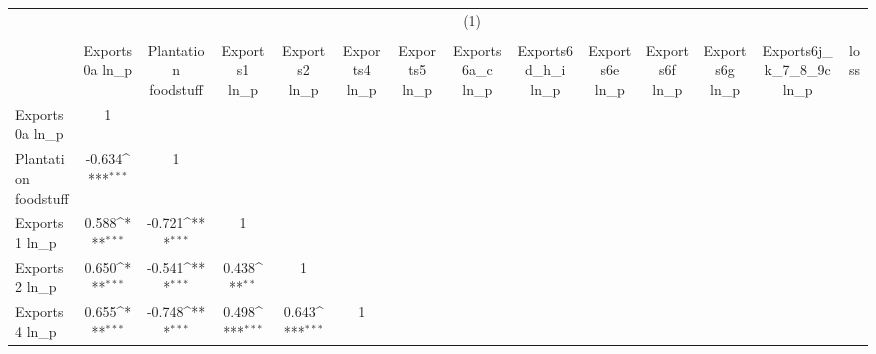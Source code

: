 {
\def\sym#1{\ifmmode^{#1}\else\(^{#1}\)\fi}
\begin{tabular}{l*{13}{c}}
\hline\hline
                &\multicolumn{13}{c}{(1)}                                                                                                                                                                                                                              \\
                &\multicolumn{13}{c}{}                                                                                                                                                                                                                                 \\
                &Exports0a ln\_p         &Plantation foodstuff         &Exports1 ln\_p         &Exports2 ln\_p         &Exports4 ln\_p         &Exports5 ln\_p         &Exports6a\_c ln\_p         &Exports6d\_h\_i ln\_p         &Exports6e ln\_p         &Exports6f ln\_p         &Exports6g ln\_p         &Exports6j\_k\_7\_8\_9c ln\_p         &     loss         \\
\hline
Exports0a ln\_p  &        1         &                  &                  &                  &                  &                  &                  &                  &                  &                  &                  &                  &                  \\
Plantation foodstuff&   -0.634\sym{***}&        1         &                  &                  &                  &                  &                  &                  &                  &                  &                  &                  &                  \\
Exports1 ln\_p   &    0.588\sym{***}&   -0.721\sym{***}&        1         &                  &                  &                  &                  &                  &                  &                  &                  &                  &                  \\
Exports2 ln\_p   &    0.650\sym{***}&   -0.541\sym{***}&    0.438\sym{**} &        1         &                  &                  &                  &                  &                  &                  &                  &                  &                  \\
Exports4 ln\_p   &    0.655\sym{***}&   -0.748\sym{***}&    0.498\sym{***}&    0.643\sym{***}&        1         &                  &                  &                  &                  &                  &                  &                  &                  \\

\end{tabular}}

